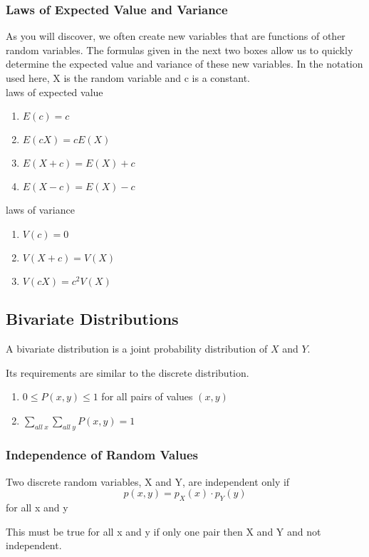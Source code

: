 \documentclass{article}
\begin{document}
\subsubsection{Laws of Expected Value and Variance}
As you will discover, we often create new variables that are functions of other random variables. The formulas given in the next two boxes allow us to quickly determine the expected value and variance of these new variables. In the notation used here, X is the random variable and c is a constant. \\

laws of expected value
\begin{enumerate}
\item $E(c) = c$
\item $E(cX) = cE(X)$
\item $E(X + c) = E(X) + c$
\item $E(X - c) = E(X) - c$
\end{enumerate}

laws of variance
\begin{enumerate}
\item $V(c) = 0$
\item $V(X + c) = V(X)$
\item $V(cX) = c^2V(X)$
\end{enumerate}

\subsection{Bivariate Distributions}
A bivariate distribution is a joint probability distribution of $X$ and $Y$.

Its requirements are similar to the discrete distribution.
\begin{enumerate}
\item  $0 \leq P(x, y) \leq 1$ for all pairs of values $(x,y)$
\item $\sum\limits_{all\:x}\sum\limits_{all\:y}P(x,y) = 1$
\end{enumerate}

\subsubsection{Independence of Random Values}
Two discrete random variables, X and Y, are independent only if
\begin{equation}
p(x,y) = p_X(x) \cdot p_Y(y) 
\end{equation}
for all x and y

This must be true for all x and y if only one pair then X and Y and not independent.
\end{document}
